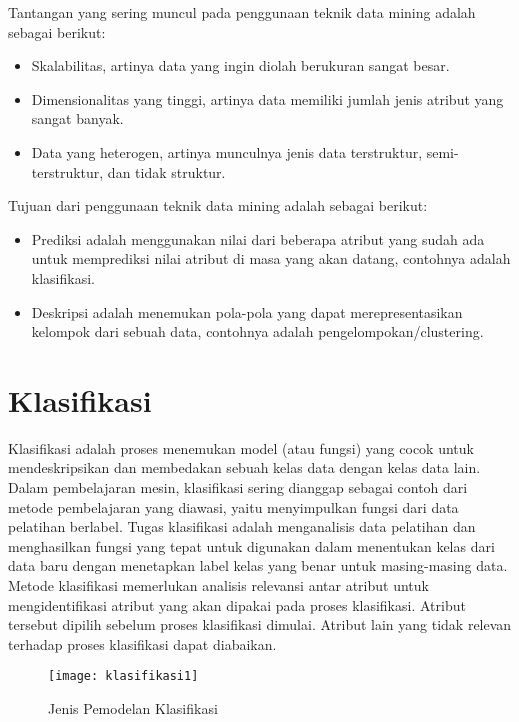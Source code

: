 \noindent Tantangan yang sering muncul pada penggunaan teknik data mining adalah sebagai berikut:

\begin{itemize}
\item Skalabilitas, artinya data yang ingin diolah berukuran sangat besar.
\item Dimensionalitas yang tinggi, artinya data memiliki jumlah jenis atribut yang sangat banyak.
\item Data yang heterogen, artinya munculnya jenis data terstruktur, semi-terstruktur, dan tidak struktur.
\end{itemize}

\noindent Tujuan dari penggunaan teknik data mining adalah sebagai berikut:

\begin{itemize}
\item Prediksi adalah menggunakan nilai dari beberapa atribut yang sudah ada untuk memprediksi nilai atribut di masa yang akan datang, contohnya adalah klasifikasi.
\item Deskripsi adalah menemukan pola-pola yang dapat merepresentasikan kelompok dari sebuah data, contohnya adalah pengelompokan/clustering.
\end{itemize}

\section{Klasifikasi} 
Klasifikasi adalah proses menemukan model (atau fungsi) yang cocok untuk mendeskripsikan dan membedakan sebuah kelas data dengan kelas data lain. Dalam pembelajaran mesin, klasifikasi sering dianggap sebagai contoh dari metode pembelajaran yang diawasi, yaitu menyimpulkan fungsi dari data pelatihan berlabel. Tugas klasifikasi adalah  menganalisis data pelatihan dan menghasilkan fungsi yang tepat untuk digunakan dalam menentukan kelas dari data baru  dengan menetapkan label kelas yang benar untuk masing-masing data. Metode klasifikasi memerlukan  analisis relevansi antar atribut untuk mengidentifikasi atribut yang akan dipakai pada proses klasifikasi. Atribut tersebut dipilih sebelum proses klasifikasi dimulai. Atribut lain yang tidak relevan terhadap proses klasifikasi dapat diabaikan. 
\\
\begin{figure}[H]
	\centering
	\texttt{[image: klasifikasi1]}
	\caption{Jenis Pemodelan Klasifikasi}
	\label{fig:klasifikasi1}
\end{figure}

